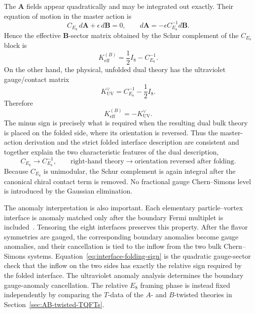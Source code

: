 \documentclass[11pt,a4paper]{article}
\numberwithin{equation}{section}
\begin{document}
The $\boldsymbol A$ fields appear quadratically and may be integrated out exactly.  Their equation of motion in the master action is
\begin{equation}
  C_{E_8}\,d\boldsymbol A
  +\epsilon\,d\boldsymbol B=0,
  \qquad
  d\boldsymbol A
  =-\epsilon C_{E_8}^{-1}d\boldsymbol B.
  \label{eq:interface-A-eom}
\end{equation}
Hence the effective $\boldsymbol B$-sector matrix obtained by the Schur complement of the $C_{E_8}$ block is
\begin{equation}
  K_{\mathrm{eff}}^{(B)}
  =\frac12 I_8-C_{E_8}^{-1}.
  \label{eq:interface-Schur-complement}
\end{equation}
On the other hand, the physical, unfolded dual theory has the ultraviolet gauge/contact matrix
\begin{equation}
  K_{\mathrm{UV}}^\vee
  =C_{E_8}^{-1}-\frac12 I_8.
  \label{eq:interface-dual-UV-K}
\end{equation}
Therefore
\begin{equation}
  K_{\mathrm{eff}}^{(B)}=-K_{\mathrm{UV}}^\vee.
  \label{eq:interface-folding-sign}
\end{equation}
The minus sign is precisely what is required when the resulting dual bulk theory is placed on the folded side, where its orientation is reversed.  Thus the master-action derivation and the strict folded interface description are consistent and together explain the two characteristic features of the dual description,
\begin{equation}
  C_{E_8}\longrightarrow C_{E_8}^{-1},
  \qquad
  \text{right-hand theory}\longrightarrow\text{orientation reversed after folding}.
  \label{eq:interface-two-features}
\end{equation}
Because $C_{E_8}$ is unimodular, the Schur complement is again integral after the canonical chiral contact term is removed.  No fractional gauge Chern--Simons level is introduced by the Gaussian elimination.

The anomaly interpretation is also important.  Each elementary particle--vortex interface is anomaly matched only after the boundary Fermi multiplet is included~\cite{Dimofte:2017tpi}.  Tensoring the eight interfaces preserves this property.  After the flavor symmetries are gauged, the corresponding boundary anomalies become gauge anomalies, and their cancellation is tied to the inflow from the two bulk Chern--Simons systems.  Equation~\eqref{eq:interface-folding-sign} is the quadratic gauge-sector check that the inflow on the two sides has exactly the relative sign required by the folded interface.  The ultraviolet anomaly analysis determines the boundary gauge-anomaly cancellation.  The relative $E_8$ framing phase is instead fixed independently by comparing the $T$-data of the $A$- and $B$-twisted theories in Section~\ref{sec:AB-twisted-TQFTs}.
\end{document}

